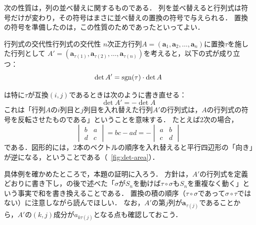 次の性質は，列の並べ替えに関するものである．
列を並べ替えると行列式は符号だけが変わり，その符号はまさに並べ替えの置換の符号で与えられる．
置換の符号を準備したのは，この性質のためであったといってよい．

\begin{prop}{行列式の交代性}{行列式の交代性}
  $n$次正方行列$A = (\bm{a}_1, \bm{a}_2, \dots, \bm{a}_n)$に置換$\tau$を施した行列として
  $A' = (\bm{a}_{\tau(1)}, \bm{a}_{\tau(2)}, \dots, \bm{a}_{\tau(n)})$を考えると，以下の式が成り立つ：
  \[
  \det A ' = \operatorname{sgn} (\tau) \cdot \det A
  \]
\end{prop}

は特に$\tau$が互換$(i,j)$であるときは次のように書き直せる：
\[
\det A'  = -\det A
\]
これは「行列$A$の$i$列目と$j$列目を入れ替えた行列$A'$の行列式は，$A$の行列式の符号を反転させたものである」ということを意味する．
たとえば$2$次の場合，
\[
  \begin{vmatrix} b & a \\ d & c \end{vmatrix} = bc - ad = -\begin{vmatrix} a & b \\ c & d \end{vmatrix}
\]
である．図形的には，$2$本のベクトルの順序を入れ替えると平行四辺形の「向き」が逆になる，ということである（\figurename~\ref{fig:det-area}）．

具体例を確かめたところで，本題の証明に入ろう．
方針は，$A'$の行列式を定義どおりに書き下し，の後で述べた「$\sigma$が$S_n$を動けば$\tau \circ \sigma$も$S_n$を重複なく動く」という事実で和を書き換えることである．
置換の積の順序（$\tau \circ \sigma$であって$\sigma \circ \tau$ではない）に注意しながら読んでほしい．
なお，$A'$の第$j$列が$\bm{a}_{\tau(j)}$であることから，$A'$の$(k, j)$成分が$a_{k\tau(j)}$となる点も確認しておこう．

